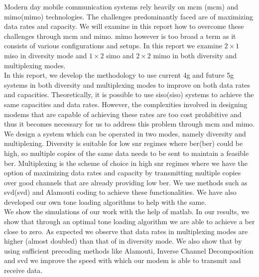 \vspace{-1cm}



Modern day mobile communication systems rely heavily on \acrlong{mcm} (\acrshort{mcm}) and \acrlong{mimo}(\acrshort{mimo}) technologies. The challenges predominantly faced are of maximizing data rates and capacity. We will examine in this report how to overcome these challenges through \acrshort{mcm} and \acrshort{mimo}. \acrshort{mimo} however is too broad a term as it consists of various configurations and setups. In this report we examine $2 \times 1$ \acrshort{miso} in diversity mode and $1 \times 2$ \acrshort{simo} and $2 \times 2$ \acrshort{mimo} in both diversity and multiplexing modes.\\




In this report, we develop the methodology to use current \acrshort{4g} and future \acrshort{5g} systems in both diversity and multiplexing modes to improve on both data rates and capacities. Theoretically, it is possible to use \acrlong{siso}(\acrshort{siso}) systems to achieve the same capacities and data rates. However, the complexities involved in designing \gls{modems} that are capable of achieving these rates are too cost prohibitive and thus it becomes necessary for us to address this problem through \acrshort{mcm} and \acrshort{mimo}.\\

We design a system which can be operated in two modes, namely diversity and multiplexing. Diversity is suitable for low \acrshort{snr} regimes where \acrlong{ber}(\acrshort{ber}) could be high, so multiple copies of the same data needs to be sent to maintain a feasible \acrshort{ber}. Multiplexing is the scheme of choice in high \acrshort{snr} regimes where we have the option of maximizing data rates and capacity by transmitting multiple copies over good channels that are already providing low \acrshort{ber}. We use methods such as \acrlong{svd}(\acrshort{svd}) and Alamouti coding to achieve these functionalities. We have also developed our own tone loading algorithms to help with the same.\\ 


We show the simulations of our work with the help of \gls{matlab}. In our results, we show that through an optimal tone loading algorithm we are able to achieve a \acrshort{ber} close to zero. As expected we observe that data rates in multiplexing modes are higher (almost doubled) than that of in diversity mode. We also show that by  using sufficient precoding methods like Alamouti, Inverse Channel Decomposition and \acrshort{svd} we improve the speed with which our modem is able to transmit and receive data.


\pagebreak